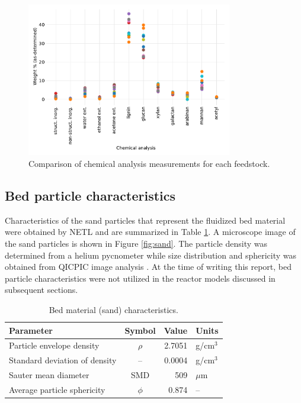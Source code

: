 \documentclass[12pt,titlepage]{article}
\begin{document}
\begin{figure}[H]
    \centering
    \includegraphics[width=0.8\textwidth]{figures/chem-analysis.pdf}
    \caption{Comparison of chemical analysis measurements for each feedstock.}
    \label{fig:chem-analysis}
\end{figure}

\subsection{Bed particle characteristics}

Characteristics of the sand particles that represent the fluidized bed material were obtained by NETL and are summarized in Table \ref{tab:sand}. A microscope image of the sand particles is shown in Figure \ref{fig:sand}. The particle density was determined from a helium pycnometer while size distribution and sphericity was obtained from QICPIC image analysis \cite{Netl-2021}. At the time of writing this report, bed particle characteristics were not utilized in the reactor models discussed in subsequent sections.

\begin{table}[H]
    \caption{Bed material (sand) characteristics.}
    \label{tab:sand}
    \centering
    \begin{tabular}{lcrl}
        \toprule
        Parameter & Symbol & Value & Units \\
        \midrule
        Particle envelope density     & $\rho$ & 2.7051 & g/cm$^3$ \\
        Standard deviation of density & --     & 0.0004 & g/cm$^3$ \\
        Sauter mean diameter          & SMD    & 509    & $\mu$m \\
        Average particle sphericity   & $\phi$ & 0.874  & -- \\
        \bottomrule
    \end{tabular}
\end{table}
\end{document}
